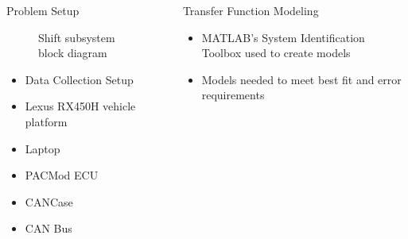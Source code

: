 \documentclass[final]{beamer}
\newlength{\sepwid}
\newlength{\onecolwid}
\begin{document}
\begin{frame}[t]
\begin{columns}[t]
\begin{column}{\onecolwid}
\begin{block}{Problem Setup}
\begin{figure}
\begin{tikzpicture}
  \end{tikzpicture}
    \caption{Shift subsystem block diagram}
    \label{fig:shiftModelArchitecture}
\end{figure}

\begin{itemize}
	\item Data Collection Setup
		\item Lexus RX450H vehicle platform
	\item Laptop
	\item PACMod ECU 
	\item CANCase
	\item CAN Bus 
\end{itemize}


\vskip -1cm
\end{block}

\end{column} %

\begin{column}{\sepwid}\end{column} %

\begin{column}{\onecolwid} %


\begin{block}{Transfer Function Modeling}
\vskip -1cm
\begin{itemize}
    \item MATLAB's System Identification Toolbox used to create models 
    \item Models needed to meet best fit and error requirements 


\end{itemize}
\end{block}
\end{column}
\end{columns}
\end{frame}
\end{document}
